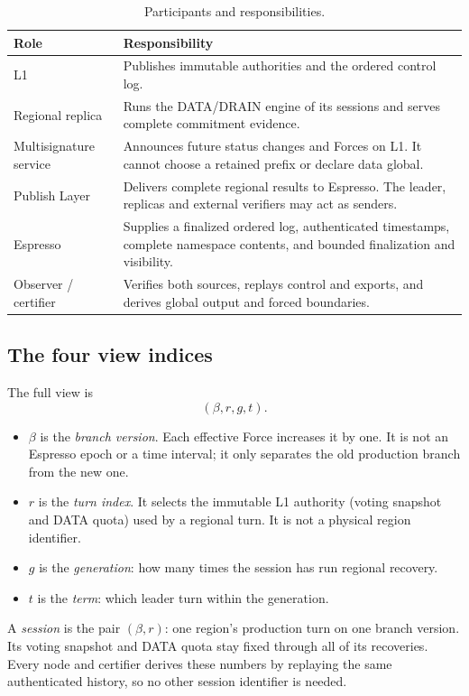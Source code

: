 \documentclass[11pt,a4paper]{article}
\newcommand{\defterm}[1]{\textcolor{rrBlue}{\textit{#1}}}
\begin{document}
\begin{table}[htbp]\centering\small
\caption{Participants and responsibilities.}\label{tab:roles}
\begin{tabularx}{\linewidth}{@{}>{\raggedright\arraybackslash}p{.19\linewidth}Y@{}}\toprule
Role & Responsibility\\\midrule
L1 & Publishes immutable authorities and the ordered control log.\\
Regional replica & Runs the DATA/DRAIN engine of its sessions and
serves complete commitment evidence.\\
Multisignature service & Announces future status changes and Forces
on L1. It cannot choose a retained prefix or declare data global.\\
Publish Layer & Delivers complete regional results to Espresso. The
leader, replicas and external verifiers may act as senders.\\
Espresso & Supplies a finalized ordered log, authenticated timestamps,
complete namespace contents, and bounded finalization and visibility.\\
Observer / certifier & Verifies both sources, replays control and
exports, and derives global output and forced boundaries.\\
\bottomrule
\end{tabularx}
\end{table}

\subsection{The four view indices}
The full view is
\[
 (\beta,r,g,t).
\]
\begin{itemize}
\item $\beta$ is the \defterm{branch version}. Each effective Force
increases it by one. It is not an Espresso epoch or a time interval; it
only separates the old production branch from the new one.
\item $r$ is the \defterm{turn index}. It selects the immutable L1
authority (voting snapshot and DATA quota) used by a regional turn. It
is not a physical region identifier.
\item $g$ is the \defterm{generation}: how many times the session has
run regional recovery.
\item $t$ is the \defterm{term}: which leader turn within the
generation.
\end{itemize}
A \defterm{session} is the pair $(\beta,r)$: one region's production
turn on one branch version. Its voting snapshot and DATA quota stay
fixed through all of its recoveries. Every node and certifier derives
these numbers by replaying the same authenticated history, so no other
session identifier is needed.
\end{document}

